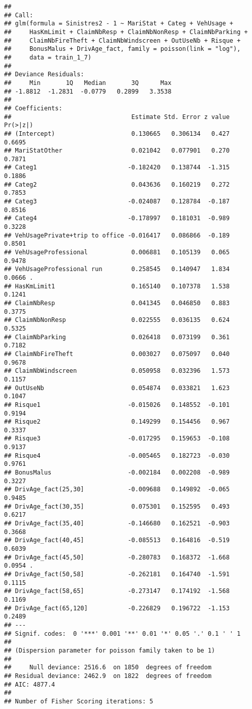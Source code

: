 \documentclass[
]{article}
\begin{document}
\begin{verbatim}
## 
## Call:
## glm(formula = Sinistres2 - 1 ~ MariStat + Categ + VehUsage + 
##     HasKmLimit + ClaimNbResp + ClaimNbNonResp + ClaimNbParking + 
##     ClaimNbFireTheft + ClaimNbWindscreen + OutUseNb + Risque + 
##     BonusMalus + DrivAge_fact, family = poisson(link = "log"), 
##     data = train_1_7)
## 
## Deviance Residuals: 
##     Min       1Q   Median       3Q      Max  
## -1.8812  -1.2831  -0.0779   0.2899   3.3538  
## 
## Coefficients:
##                                 Estimate Std. Error z value Pr(>|z|)  
## (Intercept)                     0.130665   0.306134   0.427   0.6695  
## MariStatOther                   0.021042   0.077901   0.270   0.7871  
## Categ1                         -0.182420   0.138744  -1.315   0.1886  
## Categ2                          0.043636   0.160219   0.272   0.7853  
## Categ3                         -0.024087   0.128784  -0.187   0.8516  
## Categ4                         -0.178997   0.181031  -0.989   0.3228  
## VehUsagePrivate+trip to office -0.016417   0.086866  -0.189   0.8501  
## VehUsageProfessional            0.006881   0.105139   0.065   0.9478  
## VehUsageProfessional run        0.258545   0.140947   1.834   0.0666 .
## HasKmLimit1                     0.165140   0.107378   1.538   0.1241  
## ClaimNbResp                     0.041345   0.046850   0.883   0.3775  
## ClaimNbNonResp                  0.022555   0.036135   0.624   0.5325  
## ClaimNbParking                  0.026418   0.073199   0.361   0.7182  
## ClaimNbFireTheft                0.003027   0.075097   0.040   0.9678  
## ClaimNbWindscreen               0.050958   0.032396   1.573   0.1157  
## OutUseNb                        0.054874   0.033821   1.623   0.1047  
## Risque1                        -0.015026   0.148552  -0.101   0.9194  
## Risque2                         0.149299   0.154456   0.967   0.3337  
## Risque3                        -0.017295   0.159653  -0.108   0.9137  
## Risque4                        -0.005465   0.182723  -0.030   0.9761  
## BonusMalus                     -0.002184   0.002208  -0.989   0.3227  
## DrivAge_fact(25,30]            -0.009688   0.149892  -0.065   0.9485  
## DrivAge_fact(30,35]             0.075301   0.152595   0.493   0.6217  
## DrivAge_fact(35,40]            -0.146680   0.162521  -0.903   0.3668  
## DrivAge_fact(40,45]            -0.085513   0.164816  -0.519   0.6039  
## DrivAge_fact(45,50]            -0.280783   0.168372  -1.668   0.0954 .
## DrivAge_fact(50,58]            -0.262181   0.164740  -1.591   0.1115  
## DrivAge_fact(58,65]            -0.273147   0.174192  -1.568   0.1169  
## DrivAge_fact(65,120]           -0.226829   0.196722  -1.153   0.2489  
## ---
## Signif. codes:  0 '***' 0.001 '**' 0.01 '*' 0.05 '.' 0.1 ' ' 1
## 
## (Dispersion parameter for poisson family taken to be 1)
## 
##     Null deviance: 2516.6  on 1850  degrees of freedom
## Residual deviance: 2462.9  on 1822  degrees of freedom
## AIC: 4877.4
## 
## Number of Fisher Scoring iterations: 5
\end{verbatim}
\end{document}
